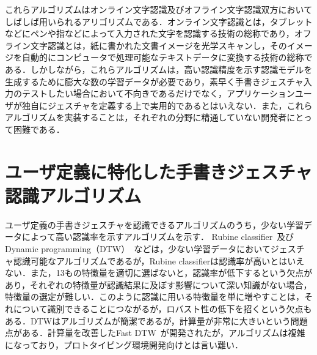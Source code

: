 これらアルゴリズムはオンライン文字認識及びオフライン文字認識双方においてしばしば用いられるアリゴリズムである．オンライン文字認識とは，タブレットなどにペンや指などによって入力された文字を認識する技術の総称であり，オフライン文字認識とは，紙に書かれた文書イメージを光学スキャンし，そのイメージを自動的にコンピュータで処理可能なテキストデータに変換する技術の総称である．しかしながら，これらアルゴリズムは，高い認識精度を示す認識モデルを生成するために膨大な数の学習データが必要であり，素早く手書きジェスチャ入力のテストしたい場合において不向きであるだけでなく，アプリケーションユーザが独自にジェスチャを定義する上で実用的であるとはいえない．また，これらアルゴリズムを実装することは，それぞれの分野に精通していない開発者にとって困難である．

\section{ユーザ定義に特化した手書きジェスチャ認識アルゴリズム}
ユーザ定義の手書きジェスチャを認識できるアルゴリズムのうち，少ない学習データによって高い認識率を示すアルゴリズムを示す．
Rubine classifier~\cite{Rubine:1991:SGE:122718.122753}及びDynamic programming（DTW）~\cite{Tappert:1982:CSR:1664966.1664979}などは，少ない学習データにおいてジェスチャ認識可能なアルゴリズムであるが，Rubine classifierは認識率が高いとはいえない．また，13もの特徴量を適切に選ばないと，認識率が低下するという欠点があり，それぞれの特徴量が認識結果に及ぼす影響について深い知識がない場合，特徴量の選定が難しい．このように認識に用いる特徴量を単に増やすことは，それについて識別できることにつながるが，ロバスト性の低下を招くという欠点もある．DTWはアルゴリズムが簡潔であるが，計算量が非常に大きいという問題点がある．計算量を改善したFast DTW~\cite{Salvador:2007:TAD:1367985.1367993}が開発されたが，アルゴリズムは複雑になっており，プロトタイピング環境開発向けとは言い難い．

